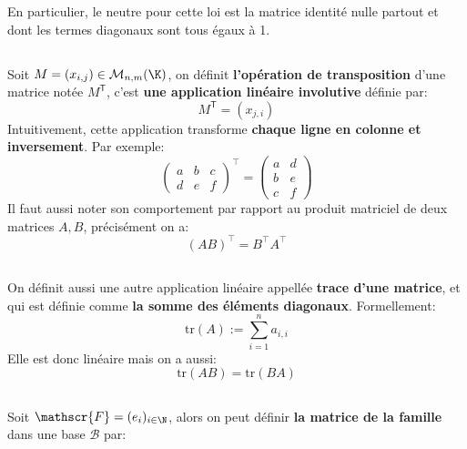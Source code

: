 En particulier, le neutre pour cette loi est la matrice identité nulle partout et dont les termes diagonaux sont tous égaux à 1.
\pagebreak

\subsection*{}

Soit \(M = (x_{i,j})\in \mathcal{M}_{n, m}(\K)\), on définit \textbf{l'opération de transposition} d'une matrice notée \(M^\mathsf{T}\), c'est \textbf{une application linéaire involutive} définie par:
\[ 
   M^\mathsf{T} = (x_{j,i})
\]
Intuitivement, cette application transforme \textbf{chaque ligne en colonne et inversement}. Par exemple:
\[
   \begin{pmatrix}
      a & b & c\\
      d & e & f
   \end{pmatrix}^\top = 
   \begin{pmatrix}
      a & d\\
      b & e\\
      c & f
   \end{pmatrix}
\]
Il faut aussi noter son comportement par rapport au produit matriciel de deux matrices \(A, B\), précisément on a:
\[ 
   (AB)^\top = B^\top A^\top
\]

\subsection*{}

On définit aussi une autre application linéaire appellée \textbf{trace d'une matrice}, et qui est définie comme \textbf{la somme des éléments diagonaux}. Formellement:
\[
   \text{tr}(A) := \sum_{i=1}^{n} a_{i, i}   
\]
Elle est donc linéaire mais on a aussi:
\[ 
   \text{tr}(AB) = \text{tr}(BA)  
\]


\subsection*{}

Soit \(\mathscr{F} = (e_i)_{i\in\N}\), alors on peut définir \textbf{la matrice de la famille} dans une base \(\mathscr{B}\) par:


